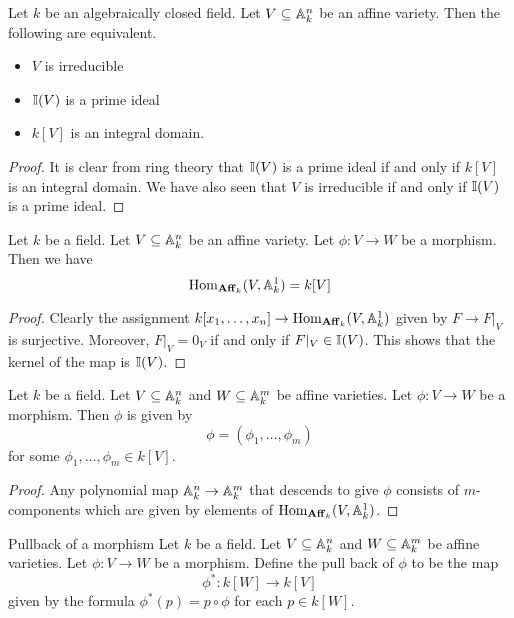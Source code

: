 \documentclass[a4paper]{article}
\begin{document}
\begin{prp}{}{} Let $k$ be an algebraically closed field. Let $V\subseteq\mathbb{A}_k^n$ be an affine variety. Then the following are equivalent. 
\begin{itemize}
\item $V$ is irreducible
\item $\mathbb{I}(V)$ is a prime ideal
\item $k[V]$ is an integral domain. 
\end{itemize}\tcbline
\begin{proof}
It is clear from ring theory that $\mathbb{I}(V)$ is a prime ideal if and only if $k[V]$ is an integral domain. We have also seen that $V$ is irreducible if and only if $\mathbb{I}(V)$ is a prime ideal. 
\end{proof}
\end{prp}

\begin{prp}{}{} Let $k$ be a field. Let $V\subseteq\mathbb{A}_k^n$ be an affine variety. Let $\phi:V\to W$ be a morphism. Then we have $$\operatorname{Hom}_{\bold{Aff}_k}(V,\mathbb{A}_k^1)=k[V]$$ \tcbline
\begin{proof}
Clearly the assignment $k[x_1,\dots,x_n]\to\operatorname{Hom}_{\bold{Aff}_k}(V,\mathbb{A}_k^1)$ given by $F\to F|_V$ is surjective. Moreover, $F|_V=0_V$ if and only if $F|_V\in\mathbb{I}(V)$. This shows that the kernel of the map is $\mathbb{I}(V)$. 
\end{proof}
\end{prp}

\begin{lmm}{}{} Let $k$ be a field. Let $V\subseteq\mathbb{A}_k^n$ and $W\subseteq\mathbb{A}_k^m$ be affine varieties. Let $\phi:V\to W$ be a morphism. Then $\phi$ is given by $$\phi=(\phi_1,\dots,\phi_m)$$ for some $\phi_1,\dots,\phi_m\in k[V]$. \tcbline
\begin{proof}
Any polynomial map $\mathbb{A}_k^n\to\mathbb{A}_k^m$ that descends to give $\phi$ consists of $m$-components which are given by elements of $\operatorname{Hom}_{\bold{Aff}_k}(V,\mathbb{A}_k^1)$. 
\end{proof}
\end{lmm}

\begin{defn}{Pullback of a morphism}{} Let $k$ be a field. Let $V\subseteq\mathbb{A}_k^n$ and $W\subseteq\mathbb{A}_k^m$ be affine varieties. Let $\phi:V\to W$ be a morphism. Define the pull back of $\phi$ to be the map $$\phi^\ast:k[W]\to k[V]$$ given by the formula $\phi^\ast(p)=p\circ\phi$ for each $p\in k[W]$. 
\end{defn}
\end{document}
